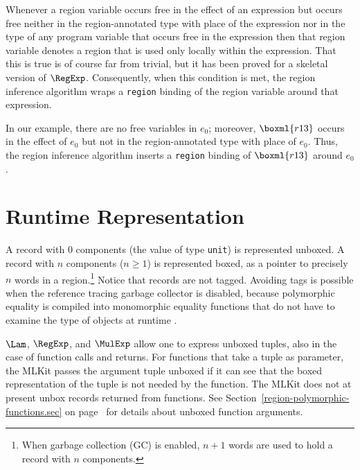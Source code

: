 \documentclass[12pt]{book}
\begin{document}
Whenever a region variable occurs free in the effect of an expression
but occurs free neither in the region-annotated type with place of the
expression nor in the type of any program variable that occurs free in
the expression then that region variable denotes a region that is used
only locally within the expression.  That this is true is of course
far from trivial, but it has been proved for a skeletal version of
$\RegExp$.  Consequently, when this condition is met, the region
inference algorithm wraps a
%
\texttt{region} binding of the region variable around that expression.

In our example, there are no free variables in $e_0$; moreover,
$\boxml{r13}$ occurs in the effect of $e_0$ but not in the
region-annotated type with place of $e_0$. Thus, the region inference
algorithm inserts a \texttt{region} binding of $\boxml{r13}$ around
$e_0$.

\section{Runtime Representation}
A
%
record with 0 components (the value of type
%
{\tt unit}) is represented unboxed.  A record with $n$ components
($n\geq 1$) is represented boxed, as a pointer to precisely $n$ words
in a region.\footnote{When garbage collection (GC) is enabled, $n+1$
  words are used to hold a record with $n$ components.}  Notice that
records are not tagged. Avoiding tags is possible when the reference
tracing garbage collector is disabled, because
%
polymorphic equality is compiled into
%
monomorphic equality functions that do not have to examine the type of
objects at runtime \cite{ElsmanTIC98}.

$\Lam$, $\RegExp$, and $\MulExp$ allow one to express unboxed tuples,
also in the case of function calls and returns. For functions that
take a tuple as parameter, the MLKit passes the argument tuple unboxed
%
%
%
%
if it can see that the boxed representation of the tuple is not needed
by the function. The MLKit does not at present unbox records returned
from functions. See Section~\ref{region-polymorphic-functions.sec} on
page~\pageref{region-polymorphic-functions.sec} for details about
unboxed function arguments.
\end{document}
